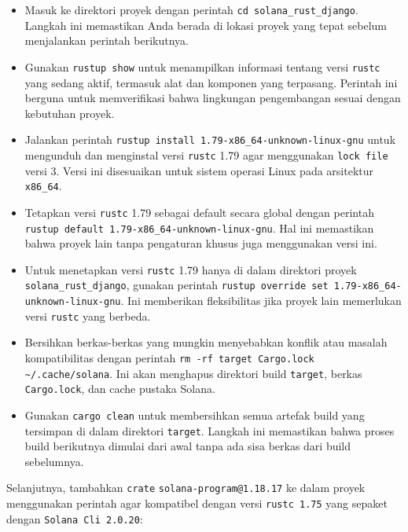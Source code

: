 \begin{itemize}
	\item Masuk ke direktori proyek dengan perintah \texttt{cd solana\_rust\_django}. Langkah ini memastikan Anda berada di lokasi proyek yang tepat sebelum menjalankan perintah berikutnya.
	
	\item Gunakan \texttt{rustup show} untuk menampilkan informasi tentang versi \texttt{rustc} yang sedang aktif, termasuk alat dan komponen yang terpasang. Perintah ini berguna untuk memverifikasi bahwa lingkungan pengembangan sesuai dengan kebutuhan proyek.
	
	\item Jalankan perintah \texttt{rustup install 1.79-x86\_64-unknown-linux-gnu} untuk mengunduh dan menginstal versi \texttt{rustc} 1.79 agar menggunakan \texttt{lock file} versi 3. Versi ini disesuaikan untuk sistem operasi Linux pada arsitektur \texttt{x86\_64}.
	
	\item Tetapkan versi \texttt{rustc} 1.79 sebagai default secara global dengan perintah \texttt{rustup default 1.79-x86\_64-unknown-linux-gnu}. Hal ini memastikan bahwa proyek lain tanpa pengaturan khusus juga menggunakan versi ini.
	
	\item Untuk menetapkan versi \texttt{rustc} 1.79 hanya di dalam direktori proyek \texttt{solana\_rust\_django}, gunakan perintah \texttt{rustup override set 1.79-x86\_64-unknown-linux-gnu}. Ini memberikan fleksibilitas jika proyek lain memerlukan versi \texttt{rustc} yang berbeda.
	
	\item Bersihkan berkas-berkas yang mungkin menyebabkan konflik atau masalah kompatibilitas dengan perintah \texttt{rm -rf target Cargo.lock \textasciitilde/.cache/solana}. Ini akan menghapus direktori build \texttt{target}, berkas \texttt{Cargo.lock}, dan cache pustaka Solana.
	
	\item Gunakan \texttt{cargo clean} untuk membersihkan semua artefak build yang tersimpan di dalam direktori \texttt{target}. Langkah ini memastikan bahwa proses build berikutnya dimulai dari awal tanpa ada sisa berkas dari build sebelumnya.
\end{itemize}


Selanjutnya, tambahkan \texttt{crate} \texttt{solana-program@1.18.17} ke dalam proyek menggunakan perintah agar kompatibel dengan versi \texttt{rustc 1.75} yang sepaket dengan \texttt{Solana Cli 2.0.20}:

